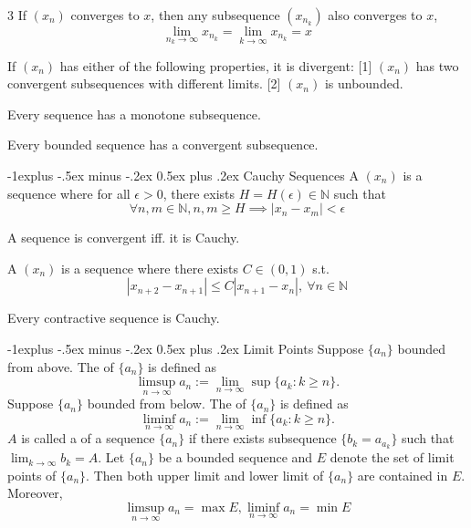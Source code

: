\documentclass[10pt,landscape,letterpaper]{article}
\makeatletter
\renewcommand{\subsection}{\@startsection{subsection}{2}{0mm}%
                                {-1explus -.5ex minus -.2ex}%
                                {0.5ex plus .2ex}%
                                {\sffamily\normalsize\itshape}}
\makeatother
\begin{document}
\begin{multicols}{3}
 If $(x_n)$ converges to $x$, then any subsequence $(x_{n_k})$ also converges to $x$, 
\[
\lim_{n_k \to \infty} x_{n_k} = \lim_{k \to \infty} x_{n_k} = x
\]


 If $(x_n)$ has either of the following properties, it is divergent: [1] $(x_n)$ has two convergent subsequences with different limits. [2] $(x_n)$ is unbounded.


 Every sequence has a monotone subsequence.


 Every bounded sequence has a convergent subsequence.




\subsection{Cauchy Sequences}
A  $(x_n)$ is a sequence where for all $\epsilon > 0$, there exists $H = H(\epsilon) \in \mathbb{N}$ such that
\[
\forall n, m \in \mathbb{N}, n, m \ge H \implies |x_n - x_m| < \epsilon
\]

 A sequence is convergent iff. it is Cauchy.


\smallbreak


A  $(x_n)$ is a sequence where there exists $C \in (0, 1)$ s.t. 
\[
|x_{n+2} - x_{n+1}| \le C |x_{n+1} - x_n|, \ \forall n \in \mathbb{N}
\]


 Every contractive sequence is Cauchy.

\subsection{Limit Points}
Suppose $\{a_n\}$ bounded from above. The  of $\{a_n\}$ is defined as
\[
\limsup_{n\rightarrow\infty} a_n := \lim_{n\rightarrow\infty} \sup\{a_k:k\geq n\}.
\]
Suppose $\{a_n\}$ bounded from below. The  of $\{a_n\}$ is defined as
\[
\liminf_{n\rightarrow\infty} a_n := \lim_{n\rightarrow\infty} \inf\{a_k:k\geq n\}.
\]
$A$ is called a  of a sequence $\{a_n\}$ if there exists subsequence $\{b_k=a_{a_k}\}$ such that $\lim_{k\rightarrow\infty} b_k = A$. 
 Let $\{a_n\}$ be a bounded sequence and $E$ denote the set of limit points of $\{a_n\}$. Then both upper limit and lower limit of $\{a_n\}$ are contained in $E$. Moreover,
\[
\limsup_{n\rightarrow\infty} a_n = \max E, \liminf_{n\rightarrow\infty} a_n = \min E
\]


\end{multicols}
\end{document}
